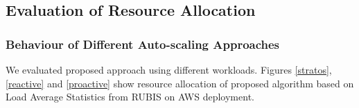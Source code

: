\subsection{Evaluation of Resource Allocation}
\subsubsection{Behaviour of Different Auto-scaling Approaches}
We evaluated proposed approach using different workloads. Figures \ref{stratos}, \ref{reactive} and \ref{proactive} show resource allocation of proposed algorithm based on Load Average Statistics from RUBIS on AWS deployment.

